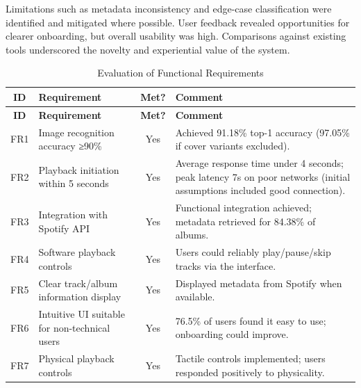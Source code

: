            Limitations such as metadata inconsistency and edge-case classification were identified and mitigated where possible. User feedback revealed opportunities for clearer onboarding, but overall usability was high. Comparisons against existing tools underscored the novelty and experiential value of the system.
    
            \begingroup
                \renewcommand\thefootnote{}
                \addtocounter{footnote}{-1}
            \endgroup
    
        \begin{longtable}{|c|p{5cm}|c|p{5cm}|}
            \caption{Evaluation of Functional Requirements} \label{tab:FR}\\
            \hline
            \textbf{ID} & \textbf{Requirement} & \textbf{Met?} & \textbf{Comment} \\
            \hline
            \endfirsthead
            \hline
            \textbf{ID} & \textbf{Requirement} & \textbf{Met?} & \textbf{Comment} \\
            \hline
            \endhead
            FR1 & Image recognition accuracy ≥90\% & Yes & Achieved 91.18\% top-1 accuracy (97.05\% if cover variants excluded). \\
            \hline
            FR2 & Playback initiation within 5 seconds & Yes & Average response time under 4 seconds; peak latency 7s on poor networks (initial assumptions included good connection). \\
            \hline
            FR3 & Integration with Spotify API & Yes & Functional integration achieved; metadata retrieved for 84.38\% of albums. \\
            \hline
            FR4 & Software playback controls & Yes & Users could reliably play/pause/skip tracks via the interface. \\
            \hline
            FR5 & Clear track/album information display & Yes & Displayed metadata from Spotify when available. \\
            \hline
            FR6 & Intuitive UI suitable for non-technical users & Yes & 76.5\% of users found it easy to use; onboarding could improve. \\
            \hline
            FR7 & Physical playback controls & Yes & Tactile controls implemented; users responded positively to physicality. \\
            \hline
        \end{longtable}
    
